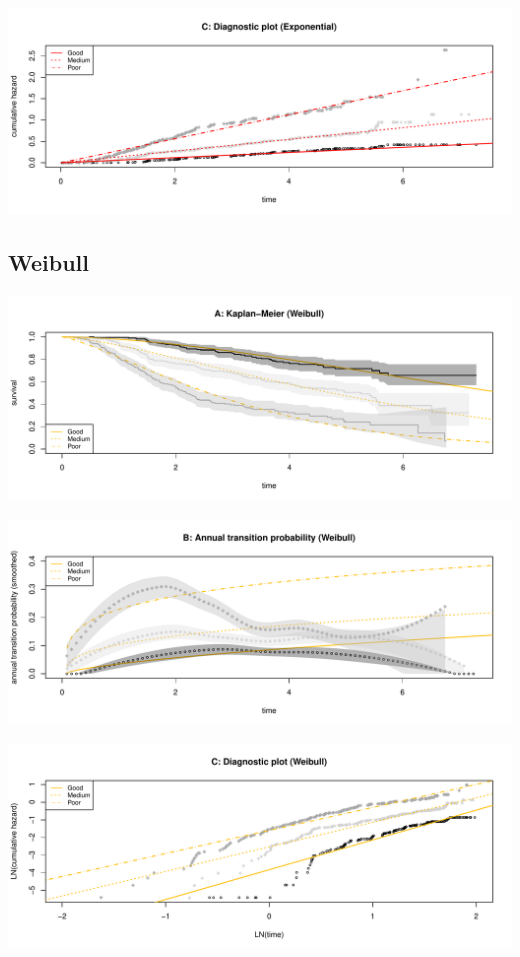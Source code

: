 \documentclass[]{article}
\begin{document}
\begin{flushleft}\includegraphics[height=0.3\textheight]{images/expo-3} \end{flushleft}

\subsection{Weibull}\label{weibull}

\begin{flushleft}\includegraphics[height=0.3\textheight]{images/weib-1} \end{flushleft}

\begin{flushleft}\includegraphics[height=0.3\textheight]{images/weib-2} \end{flushleft}

\begin{flushleft}\includegraphics[height=0.3\textheight]{images/weib-3} \end{flushleft}
\end{document}
